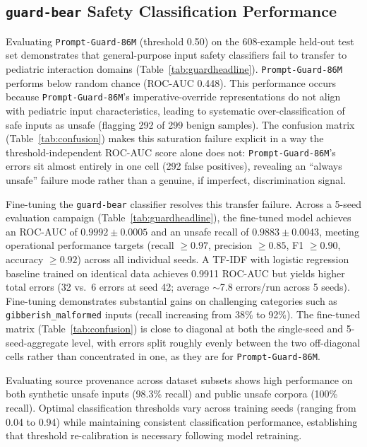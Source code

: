\documentclass[pdflatex,sn-mathphys-num]{sn-jnl-official}%
\begin{document}
\subsection{\texttt{guard-bear} Safety Classification Performance}\label{sec:guardresults}

Evaluating \texttt{Prompt-Guard-86M} (threshold 0.50) on the 608-example held-out test set demonstrates that general-purpose input safety classifiers fail to transfer to pediatric interaction domains (Table~\ref{tab:guardheadline}). \texttt{Prompt-Guard-86M} performs below random chance (ROC-AUC 0.448). This performance occurs because \texttt{Prompt-Guard-86M}'s imperative-override representations do not align with pediatric input characteristics, leading to systematic over-classification of safe inputs as unsafe (flagging 292 of 299 benign samples). The confusion matrix (Table~\ref{tab:confusion}) makes this saturation failure explicit in a way the threshold-independent ROC-AUC score alone does not: \texttt{Prompt-Guard-86M}'s errors sit almost entirely in one cell (292 false positives), revealing an ``always unsafe'' failure mode rather than a genuine, if imperfect, discrimination signal.

Fine-tuning the \texttt{guard-bear} classifier resolves this transfer failure. Across a 5-seed evaluation campaign (Table~\ref{tab:guardheadline}), the fine-tuned model achieves an ROC-AUC of $0.9992\pm0.0005$ and an unsafe recall of $0.9883\pm0.0043$, meeting operational performance targets (recall $\geq 0.97$, precision $\geq 0.85$, F1 $\geq 0.90$, accuracy $\geq 0.92$) across all individual seeds. A TF-IDF with logistic regression baseline trained on identical data achieves 0.9911 ROC-AUC but yields higher total errors (32 vs.\ 6 errors at seed 42; average $\sim$7.8 errors/run across 5 seeds). Fine-tuning demonstrates substantial gains on challenging categories such as \texttt{gibberish\_malformed} inputs (recall increasing from 38\% to 92\%). The fine-tuned matrix (Table~\ref{tab:confusion}) is close to diagonal at both the single-seed and 5-seed-aggregate level, with errors split roughly evenly between the two off-diagonal cells rather than concentrated in one, as they are for \texttt{Prompt-Guard-86M}.

Evaluating source provenance across dataset subsets shows high performance on both synthetic unsafe inputs (98.3\% recall) and public unsafe corpora (100\% recall). Optimal classification thresholds vary across training seeds (ranging from 0.04 to 0.94) while maintaining consistent classification performance, establishing that threshold re-calibration is necessary following model retraining.
\end{document}
